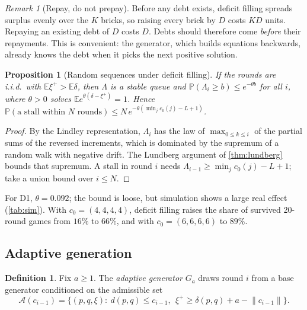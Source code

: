 \documentclass[11pt,a4paper]{article}
\newtheorem{proposition}[theorem]{Proposition}
\theoremstyle{definition}
\newtheorem{definition}[theorem]{Definition}
\theoremstyle{remark}
\newtheorem{remark}[theorem]{Remark}
\newcommand{\E}{\mathbb{E}}
\renewcommand{\P}{\mathbb{P}}
\newcommand{\norm}[1]{\lVert #1\rVert}
\newcommand{\pos}[1]{{#1}^{+}}
\begin{document}
\begin{remark}[Repay, do not prepay]
Before any debt exists, deficit filling spreads surplus evenly over the $K$ bricks, so
raising every brick by $D$ costs $KD$ units. Repaying an existing debt of $D$ costs $D$.
Debts should therefore come \emph{before} their repayments. This is convenient: the
generator, which builds equations backwards, already knows the debt when it picks the
next positive solution.
\end{remark}

\begin{proposition}[Random sequences under deficit filling]
If the rounds are i.i.d.\ with $\E\pos\xi>\E\delta$, then $\Lambda$ is a stable queue and
$\P(\Lambda_i\ge b)\le e^{-\theta b}$ for all $i$, where $\theta>0$ solves
$\E e^{\theta(\delta-\pos\xi)}=1$. Hence
$\P(\text{a stall within }N\text{ rounds})\le N\,e^{-\theta(\min_jc_0(j)-L+1)}$.
\end{proposition}
\begin{proof}
By the Lindley representation, $\Lambda_i$ has the law of
$\max_{0\le k\le i}$ of the partial sums of the reversed increments, which is dominated
by the supremum of a random walk with negative drift. The Lundberg argument of
\cref{thm:lundberg} bounds that supremum. A stall in round $i$ needs
$\Lambda_{i-1}\ge\min_jc_0(j)-L+1$; take a union bound over $i\le N$.
\end{proof}

For D1, $\theta=0.092$; the bound is loose, but simulation shows a large real effect
(\cref{tab:sim}). With $c_0=(4,4,4,4)$, deficit filling raises the share of survived
20-round games from $16\%$ to $66\%$, and with $c_0=(6,6,6,6)$ to $89\%$.

\subsection{Adaptive generation}

\begin{definition}
Fix $a\ge1$. The \emph{adaptive generator} $G_a$ draws round $i$ from a base generator
conditioned on the admissible set
\[
\mathcal A(c_{i-1})=\bigl\{(p,q,\xi):\ d(p,q)\le c_{i-1},\ \ \pos\xi\ge\delta(p,q)+a-\norm{c_{i-1}}\bigr\}.
\]
\end{definition}
\end{document}
